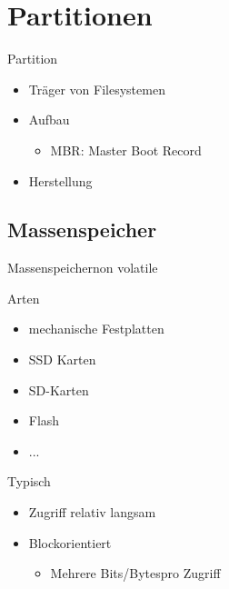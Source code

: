 \section{Partitionen}
\begin{frame}{Partition}
 \begin{itemize}
  \item Träger von Filesystemen
  \item Aufbau
  \begin{itemize}
   \item MBR: Master Boot Record
  \end{itemize}
  \item Herstellung
 \end{itemize}
\end{frame}

\subsection{Massenspeicher}
\begin{frame}{Massenspeicher}{non volatile}
 \begin{block}{Arten}
  \begin{itemize}
   \item mechanische Festplatten
   \item SSD Karten
   \item SD-Karten
   \item Flash
   \item ...
  \end{itemize}
 \end{block}
 \begin{block}{Typisch}
  \begin{itemize}
   \item Zugriff relativ langsam
   \item Blockorientiert 
   \begin{itemize}
    \item Mehrere Bits/Bytespro Zugriff
   \end{itemize}
  \end{itemize}
 \end{block}
\end{frame}


